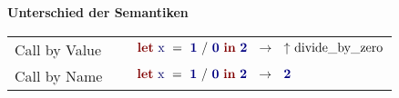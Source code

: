 {
  {\bf Unterschied der Semantiken}\\[5mm]
  \begin{tabular}{ll}
     Call by Value $\quad$      & $\ExprLet{\ExprIdentifier{x}}{}
                                  {\ExprInfixOperation{/}{\ExprConstant{1}}{\ExprConstant{0}}}
                                  {\ExprConstant{2}} \ \ \to \ \ \ExprExn{divide\_by\_zero}$ \\[3mm]
     Call by Name $\quad$       & $\ExprLet{\ExprIdentifier{x}}{}
                                  {\ExprInfixOperation{/}{\ExprConstant{1}}{\ExprConstant{0}}}
                                  {\ExprConstant{2}} \ \ \to \ \ \ExprConstant{2}$ \\[3mm]
  \end{tabular}
}